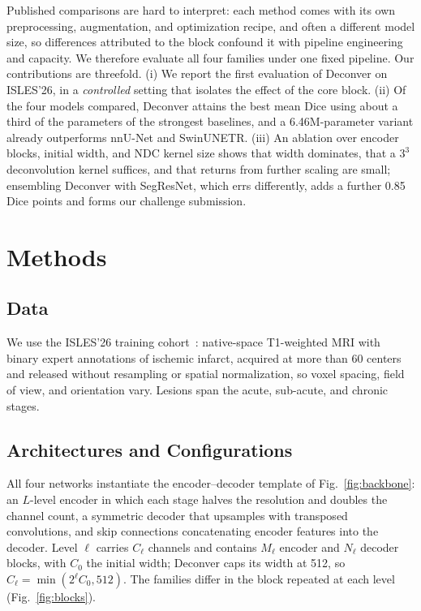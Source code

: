 \documentclass[runningheads,a4paper]{llncs}
\begin{document}
Published comparisons are hard to interpret: each method comes with its own preprocessing, augmentation, and optimization recipe, and often a different model size, so differences attributed to the block confound it with pipeline engineering and capacity. We therefore evaluate all four families under one fixed pipeline. Our contributions are threefold. (i) We report the first evaluation of Deconver on ISLES'26, in a \emph{controlled} setting that isolates the effect of the core block. (ii) Of the four models compared, Deconver attains the best mean Dice using about a third of the parameters of the strongest baselines, and a 6.46M-parameter variant already outperforms nnU-Net and SwinUNETR. (iii) An ablation over encoder blocks, initial width, and NDC kernel size shows that width dominates, that a $3^3$ deconvolution kernel suffices, and that returns from further scaling are small; ensembling Deconver with SegResNet, which errs differently, adds a further 0.85 Dice points and forms our challenge submission.

\section{Methods}
\label{sec:methods}

\subsection{Data}

We use the ISLES'26 training cohort~\cite{isles26}: native-space T1-weighted MRI with binary expert annotations of ischemic infarct, acquired at more than 60 centers and released without resampling or spatial normalization, so voxel spacing, field of view, and orientation vary. Lesions span the acute, sub-acute, and chronic stages.

\subsection{Architectures and Configurations}

All four networks instantiate the encoder--decoder template of Fig.~\ref{fig:backbone}: an $L$-level encoder in which each stage halves the resolution and doubles the channel count, a symmetric decoder that upsamples with transposed convolutions, and skip connections concatenating encoder features into the decoder. Level $\ell$ carries $C_\ell$ channels and contains $M_\ell$ encoder and $N_\ell$ decoder blocks, with $C_0$ the initial width; Deconver caps its width at 512, so $C_\ell = \min(2^\ell C_0, 512)$. The families differ in the block repeated at each level (Fig.~\ref{fig:blocks}).
\end{document}
